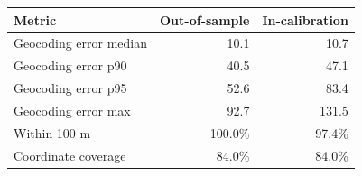 \begin{tabular}{lrr}
\toprule
Metric & Out-of-sample & In-calibration \\
\midrule
Geocoding error median & 10.1 & 10.7 \\
Geocoding error p90 & 40.5 & 47.1 \\
Geocoding error p95 & 52.6 & 83.4 \\
Geocoding error max & 92.7 & 131.5 \\
Within 100 m & 100.0\% & 97.4\% \\
Coordinate coverage & 84.0\% & 84.0\% \\
\bottomrule
\end{tabular}
